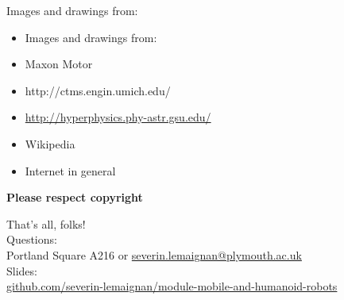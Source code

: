 \documentclass[compress]{beamer}
\begin{document}
%
%
%
%
%

\begin{frame}{Images and drawings from:}

\begin{itemize}

\item Images and drawings from:
\item Maxon Motor
\item http://ctms.engin.umich.edu/
\item \url{http://hyperphysics.phy-astr.gsu.edu/}
\item Wikipedia
\item Internet in general
\end{itemize}

\textbf{Please respect copyright}

\end{frame}


\begin{frame}{}
    \begin{center}
        \Large
        That's all, folks!\\[2em]
        \normalsize
        Questions:\\
        Portland Square A216 or \url{severin.lemaignan@plymouth.ac.uk} \\[1em]

        Slides:\\ \href{https://github.com/severin-lemaignan/module-mobile-and-humanoid-robots}{\small github.com/severin-lemaignan/module-mobile-and-humanoid-robots}

    \end{center}
\end{frame}
\end{document}
